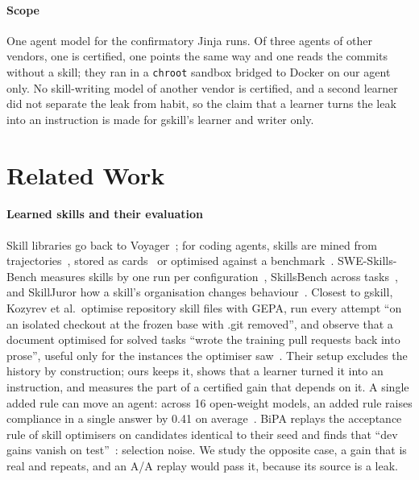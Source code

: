 \documentclass[sigconf,review,anonymous]{acmart}
\begin{document}
\paragraph{Scope}
One agent model for the confirmatory Jinja runs. Of three agents of other vendors, one is certified,
one points the same way and one reads the commits without a skill; they ran in a \texttt{chroot}
sandbox bridged to Docker on our agent only. No skill-writing model of another vendor is certified,
and a second learner did not separate the leak from habit, so the claim that a learner turns the
leak into an instruction is made for gskill's learner and writer only.

\section{Related Work}
\paragraph{Learned skills and their evaluation}
Skill libraries go back to Voyager~\cite{voyager}; for coding agents, skills are mined from
trajectories~\cite{xreposkill}, stored as cards~\cite{memgovern_repo} or optimised against a
benchmark~\cite{gskill}. SWE-Skills-Bench measures skills by one run per configuration~\cite{sskb_paper},
SkillsBench across tasks~\cite{skillsbench_2026}, and SkillJuror how a skill's organisation changes
behaviour~\cite{skilljuror_2026}. Closest to gskill, Kozyrev et al.\ optimise repository skill files
with GEPA, run every attempt ``on an isolated checkout at the frozen base with .git removed'', and
observe that a document optimised for solved tasks ``wrote the training pull requests back into
prose'', useful only for the instances the optimiser saw~\cite{skill_issue_2026}. Their setup
excludes the history by construction; ours keeps it, shows that a learner turned it into an
instruction, and measures the part of a certified gain that depends on it. A single added rule can
move an agent: across 16 open-weight models, an added rule raises compliance in a single answer by 0.41 on
average~\cite{agent_skill_evolution_2610_04832}. BiPA replays the acceptance rule of skill
optimisers on candidates identical to their seed and finds that ``dev gains vanish on
test''~\cite{bipa_2610_37201}: selection noise. We study the opposite case, a gain that is real and
repeats, and an A/A replay would pass it, because its source is a leak.
\end{document}

